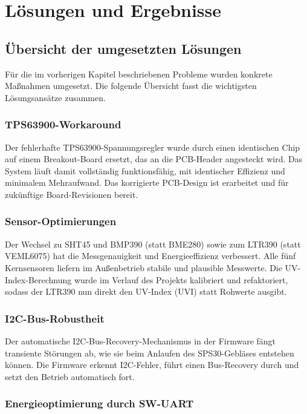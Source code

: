 \chapter{Lösungen und Ergebnisse}

\section*{Übersicht der umgesetzten Lösungen}

Für die im vorherigen Kapitel beschriebenen Probleme wurden konkrete Maßnahmen umgesetzt. Die folgende Übersicht fasst die wichtigsten Lösungsansätze zusammen.

\subsection*{TPS63900-Workaround}

Der fehlerhafte TPS63900-Spannungsregler wurde durch einen identischen Chip auf einem Breakout-Board ersetzt, das an die PCB-Header angesteckt wird. Das System läuft damit vollständig funktionsfähig, mit identischer Effizienz und minimalem Mehraufwand. Das korrigierte PCB-Design ist erarbeitet und für zukünftige Board-Revisionen bereit.

\subsection*{Sensor-Optimierungen}

Der Wechsel zu SHT45 und BMP390 (statt BME280) sowie zum LTR390 (statt VEML6075) hat die Messgenauigkeit und Energieeffizienz verbessert. Alle fünf Kernsensoren liefern im Außenbetrieb stabile und plausible Messwerte. Die UV-Index-Berechnung wurde im Verlauf des Projekts kalibriert und refaktoriert, sodass der LTR390 nun direkt den UV-Index (UVI) statt Rohwerte ausgibt.

\subsection*{I2C-Bus-Robustheit}

Der automatische I2C-Bus-Recovery-Mechanismus in der Firmware fängt transiente Störungen ab, wie sie beim Anlaufen des SPS30-Gebläses entstehen können. Die Firmware erkennt I2C-Fehler, führt einen Bus-Recovery durch und setzt den Betrieb automatisch fort.

\subsection*{Energieoptimierung durch SW-UART}

